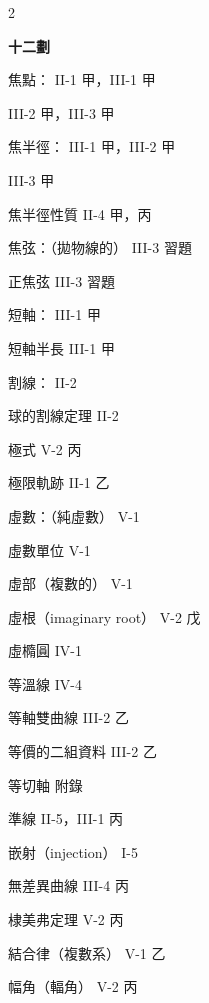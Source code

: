 \begin{multicols}{2}
\vspace{0.8em}
\begin{center}
\textbf{\large 十二劃}
\end{center}

\noindent 焦點： \hfill II-1 甲，III-1 甲\par
\noindent\hspace*{1.5em} III-2 甲，III-3 甲\par
\noindent 焦半徑： \hfill III-1 甲，III-2 甲\par
\noindent\hspace*{1.5em} III-3 甲\par
\noindent 焦半徑性質 \hfill II-4 甲，丙\par
\noindent 焦弦：（拋物線的） \hfill III-3 習題\par
\noindent\hspace*{1.5em} 正焦弦 \hfill III-3 習題\par
\noindent 短軸： \hfill III-1 甲\par
\noindent\hspace*{1.5em} 短軸半長 \hfill III-1 甲\par
\noindent 割線： \hfill II-2\par
\noindent\hspace*{1.5em} 球的割線定理 \hfill II-2\par
\noindent 極式 \hfill V-2 丙\par
\noindent 極限軌跡 \hfill II-1 乙\par
\noindent 虛數：（純虛數） \hfill V-1\par
\noindent\hspace*{1.5em} 虛數單位 \hfill V-1\par
\noindent\hspace*{1.5em} 虛部（複數的） \hfill V-1\par
\noindent\hspace*{1.5em} 虛根（imaginary root） \hfill V-2 戊\par
\noindent 虛橢圓 \hfill IV-1\par
\noindent 等溫線 \hfill IV-4\par
\noindent 等軸雙曲線 \hfill III-2 乙\par
\noindent 等價的二組資料 \hfill III-2 乙\par
\noindent 等切軸 \hfill 附錄\par
\noindent 準線 \hfill II-5，III-1 丙\par
\noindent 嵌射（injection） \hfill I-5\par
\noindent 無差異曲線 \hfill III-4 丙\par
\noindent 棣美弗定理 \hfill V-2 丙\par
\noindent 結合律（複數系） \hfill V-1 乙\par
\noindent 幅角（輻角） \hfill V-2 丙\par


\end{multicols}

